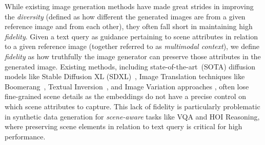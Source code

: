 While existing image generation methods have made great strides in improving the \textit{diversity} (defined as how different the generated images are from a given reference image and from each other), they often fall short in maintaining high \textit{fidelity}. Given a text query as guidance pertaining to scene attributes in relation to a given reference image (together referred to as \textit{multimodal context}), we define \textit{fidelity} as how truthfully the image generator can preserve those attributes in the generated image. Existing methods, including state-of-the-art~(SOTA) diffusion models like Stable Diffusion XL (SDXL)~\citep{podell2023sdxl}, Image Translation techniques like Boomerang~\citep{pan2023boomerang}, Textual Inversion~\citep{gal2022image, trabucco2023effective}, and Image Variation approaches \citep{xu2023versatile, feng2023diverse}, often lose fine-grained scene details as the embeddings do not have a precise control on which scene attributes to capture. This lack of fidelity is particularly problematic in synthetic data generation for \textit{scene-aware} tasks like VQA and HOI Reasoning, where preserving scene elements in relation to text query is critical for high performance.

 

